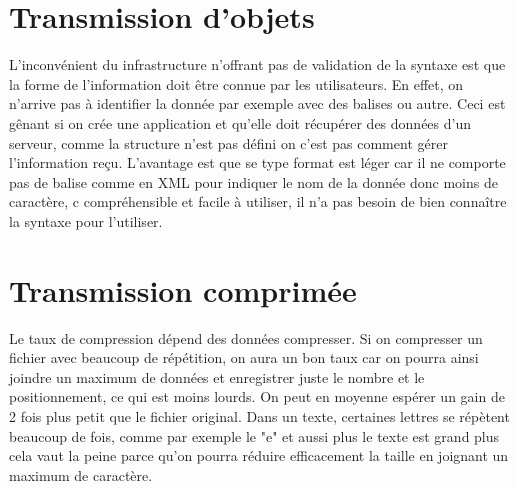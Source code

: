 \documentclass[10pt,a4paper]{article}
\begin{document}
\section{Transmission d'objets}
L'inconvénient du infrastructure n'offrant pas de validation de la syntaxe est que la forme de l'information doit être connue par les utilisateurs. 
En effet, on n'arrive pas à identifier la donnée par exemple avec des balises ou autre. 
Ceci est gênant si on crée une application et qu'elle doit récupérer des données d'un serveur, comme la structure n'est pas défini on c'est pas comment gérer l'information reçu.
L'avantage est que se type format est léger car il  ne comporte pas de balise comme en XML pour indiquer le nom de la donnée donc moins de caractère, c
compréhensible et facile à utiliser, il n'a pas besoin de bien connaître la syntaxe pour l'utiliser.


\section{Transmission comprimée}
Le taux de compression dépend des données compresser. 
Si on compresser un fichier avec beaucoup de répétition, on aura un bon taux car on pourra ainsi joindre un maximum de données et enregistrer juste le nombre et le positionnement, ce qui est moins lourds. 
On peut en moyenne espérer un gain de 2 fois plus petit que le fichier original. Dans un texte, certaines lettres se répètent beaucoup de fois, comme par exemple le "e" et aussi plus le texte est grand plus cela vaut la peine parce qu'on pourra réduire efficacement la taille en joignant un maximum de caractère. 
\end{document}
